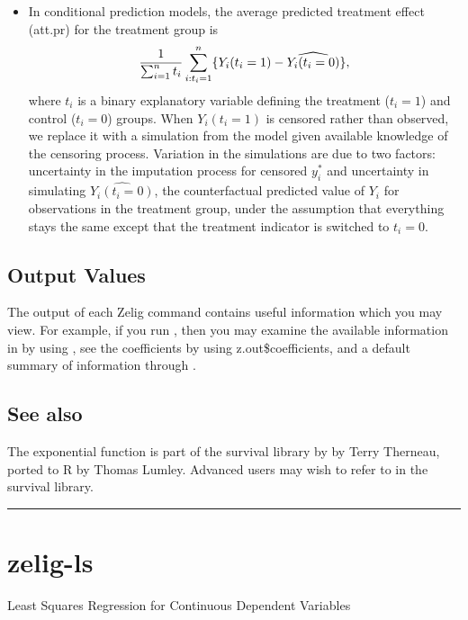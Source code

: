 \documentclass[letterpaper,10pt,english]{sphinxmanual}
\begin{document}
\begin{itemize}
\item {} 
In conditional prediction models, the average predicted treatment
effect (att.pr) for the treatment group is
\begin{gather}
\begin{split}\frac{1}{\sum_{i=1}^n t_i} \sum_{i:t_i=1}^n \{  Y_i(t_i=1) -
\widehat{Y_i(t_i=0)} \},\end{split}\notag
\end{gather}
where \(t_i\) is a binary explanatory variable defining the
treatment (\(t_i=1\)) and control (\(t_i=0\)) groups. When
\(Y_i(t_i=1)\) is censored rather than observed, we replace it
with a simulation from the model given available knowledge of the
censoring process. Variation in the simulations are due to two
factors: uncertainty in the imputation process for censored
\(y_i^*\) and uncertainty in simulating
\(\widehat{Y_i(t_i=0)}\), the counterfactual predicted value of
\(Y_i\) for observations in the treatment group, under the
assumption that everything stays the same except that the treatment
indicator is switched to \(t_i=0\).

\end{itemize}


\subsection{Output Values}
\label{vignette:id17}
The output of each Zelig command contains useful information which you
may view. For example, if you run
, then you may
examine the available information in  by using
, see the coefficients by using z.out\$coefficients, and
a default summary of information through .


\subsection{See also}
\label{vignette:id18}
The exponential function is part of the survival library by by Terry
Therneau, ported to R by Thomas Lumley. Advanced users may wish to refer
to  in the survival library.


\bigskip\hrule{}\bigskip



\section{zelig-ls}
\label{vignette:zelig-ls}
Least Squares Regression for Continuous Dependent Variables
\end{document}
